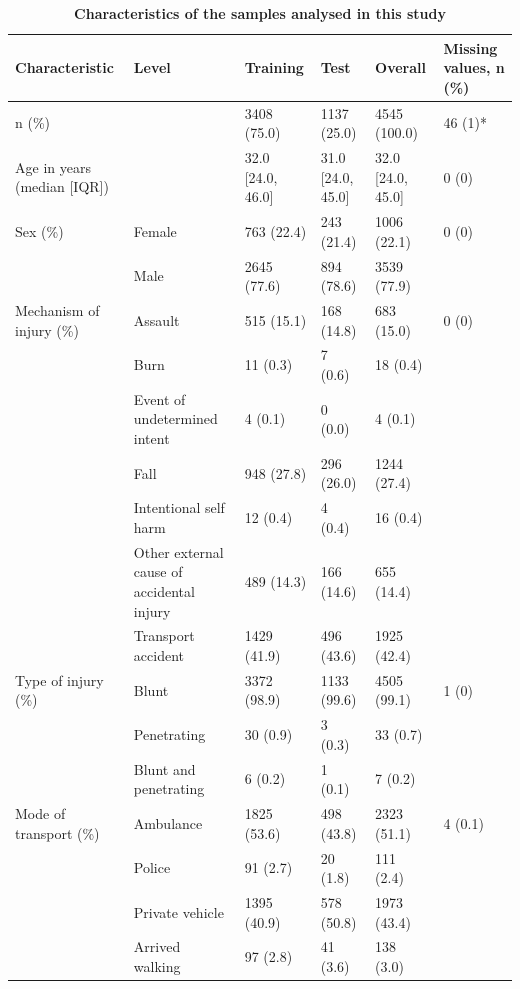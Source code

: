\documentclass[10pt,letterpaper]{article}\usepackage[]{graphicx}\usepackage[]{color}
\begin{document}
\begin{table}[!ht] 
 \begin{adjustwidth}{-2.25in}{0in}
\centering
\caption{\bf Characteristics of the samples analysed in this study} 
\label{tab:sample-characteristics}
\begin{adjustbox}{max width=\linewidth} 
\begin{tabular} 
{llllll}
  \hline
Characteristic & Level & Training & Test & Overall & Missing values, n (\%) \\ 
  \hline
n (\%) &  & 3408 (75.0) & 1137 (25.0) & 4545 (100.0) & 46 (1)* \\ 
  Age in years (median [IQR]) &  & 32.0 [24.0, 46.0] & 31.0 [24.0, 45.0] & 32.0 [24.0, 45.0] & 0 (0) \\ 
  Sex (\%) & Female & 763 (22.4) & 243 (21.4) & 1006 (22.1) & 0 (0) \\ 
   & Male & 2645 (77.6) & 894 (78.6) & 3539 (77.9) &  \\ 
  Mechanism of injury (\%) & Assault & 515 (15.1) & 168 (14.8) & 683 (15.0) & 0 (0) \\ 
   & Burn & 11 (0.3) & 7 (0.6) & 18 (0.4) &  \\ 
   & Event of undetermined intent & 4 (0.1) & 0 (0.0) & 4 (0.1) &  \\ 
   & Fall & 948 (27.8) & 296 (26.0) & 1244 (27.4) &  \\ 
   & Intentional self harm & 12 (0.4) & 4 (0.4) & 16 (0.4) &  \\ 
   & Other external cause of accidental injury & 489 (14.3) & 166 (14.6) & 655 (14.4) &  \\ 
   & Transport accident & 1429 (41.9) & 496 (43.6) & 1925 (42.4) &  \\ 
  Type of injury (\%) & Blunt & 3372 (98.9) & 1133 (99.6) & 4505 (99.1) & 1 (0) \\ 
   & Penetrating & 30 (0.9) & 3 (0.3) & 33 (0.7) &  \\ 
   & Blunt and penetrating & 6 (0.2) & 1 (0.1) & 7 (0.2) &  \\ 
  Mode of transport (\%) & Ambulance & 1825 (53.6) & 498 (43.8) & 2323 (51.1) & 4 (0.1) \\ 
   & Police & 91 (2.7) & 20 (1.8) & 111 (2.4) &  \\ 
   & Private vehicle & 1395 (40.9) & 578 (50.8) & 1973 (43.4) &  \\ 
   & Arrived walking & 97 (2.8) & 41 (3.6) & 138 (3.0) &  \\ 

\end{tabular}
\end{adjustbox}
\end{adjustwidth}
\end{table}
\end{document}
